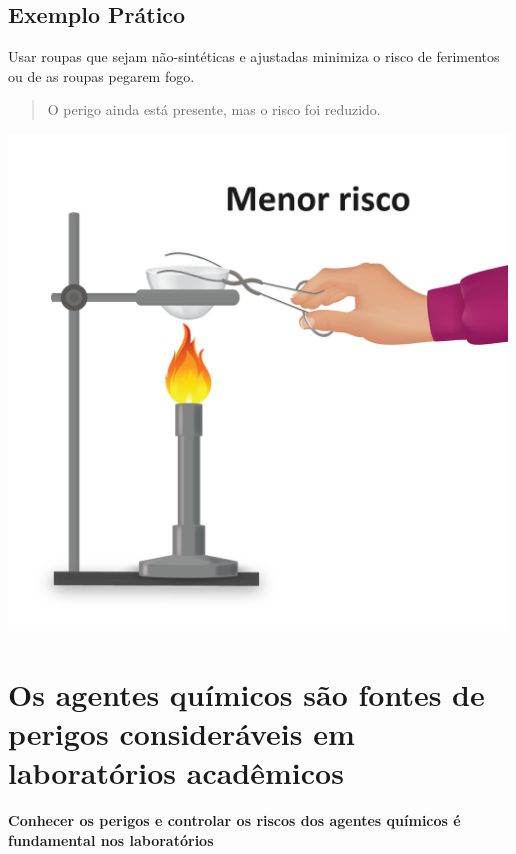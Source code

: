 \documentclass[
  letterpaper,
  DIV=11,
  numbers=noendperiod]{scrartcl}
\begin{document}
\subsection{Exemplo Prático}\label{exemplo-pruxe1tico-1}

Usar roupas que sejam não-sintéticas e ajustadas minimiza o risco de
ferimentos ou de as roupas pegarem fogo.

\begin{quote}
O perigo ainda está presente, mas o risco foi reduzido.
\end{quote}

\includegraphics[width=5.20833in,height=\textheight,keepaspectratio]{imagens/image_4.b26a4074.png}

\section{\texorpdfstring{Os \textbf{agentes químicos} são \textbf{fontes
de perigos} consideráveis em laboratórios
acadêmicos}{Os agentes químicos são fontes de perigos consideráveis em laboratórios acadêmicos}}\label{os-agentes-quuxedmicos-suxe3o-fontes-de-perigos-consideruxe1veis-em-laboratuxf3rios-acaduxeamicos}

\textbf{Conhecer os perigos e controlar os riscos dos agentes químicos é
fundamental nos laboratórios}
\end{document}
